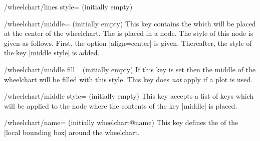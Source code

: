 \documentclass[a4paper,english,dvipsnames]{ltxdoc}
\begin{document}
\begin{stylekey}{/wheelchart/lines style= (initially \normalfont empty)}
\begin{codeexample}[width=10cm,preamble={\usetikzlibrary{decorations.markings}}]
\begin{tikzpicture}
\wheelchart[
    data=\WCvarC: \WCvarA,
    data angle shift=\WCvarG,
    data sep=0,
    data style={draw=\WCvarB,fill=\WCvarB!20},
    lines=1.5,
    lines ext=1,
    lines sep=-1,
    lines style={
        Black,
        postaction=decorate,
        decoration={
            markings,
            mark=at position 0 with {\fill[Black] (0,0) circle[radius=0.15];}
        }
    },
    pie,
    start angle=331.2
]{\exampleforthismanual}
\end{tikzpicture}
\end{codeexample}
\end{stylekey}
\begin{key}{/wheelchart/middle= (initially \normalfont empty)}
This key contains the  which will be placed at the center of the wheelchart. The  is placed in a node. The style of this node is given as follows. First, the option |align=center| is given. Thereafter, the style of the key |middle style| is added.
\end{key}
\begin{stylekey}{/wheelchart/middle fill= (initially \normalfont empty)}
If this key is set then the middle of the wheelchart will be filled with this style. This key does \emph{not} apply if a plot is used.
\begin{codeexample}[width=10cm]
\begin{tikzpicture}
\wheelchart[
    counterclockwise,
    middle fill={
        Green,
        draw=Red,
        ultra thick
    },
    radius={0.8*\WCcount}
        {0.4+0.8*\WCcount},
    slices style={
        draw=Blue,
        fill=none,
        ultra thick
    },
    start angle=0,
    total angle=300,
    total count=4
]{}
\end{tikzpicture}
\end{codeexample}
\end{stylekey}
\begin{stylekey}{/wheelchart/middle style= (initially \normalfont empty)}
This key accepts a list of keys which will be applied to the node where the contents of the key |middle| is placed.
\end{stylekey}
\begin{key}{/wheelchart/name= (initially wheelchart@name)}
This key defines the  of the |local bounding box| around the wheelchart.
\end{key}
\end{document}
